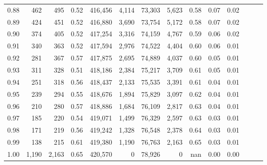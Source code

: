 \begin{tabular}{rrrrrrrrrrrrrr}
0.88 &     462 &    495 &  0.52 &  416,456 &    4,114 &  73,303 &   5,623 &  0.58 &  0.07 &      0.02 \\
0.89 &     424 &    451 &  0.52 &  416,880 &    3,690 &  73,754 &   5,172 &  0.58 &  0.07 &      0.02 \\
0.90 &     374 &    405 &  0.52 &  417,254 &    3,316 &  74,159 &   4,767 &  0.59 &  0.06 &      0.02 \\
0.91 &     340 &    363 &  0.52 &  417,594 &    2,976 &  74,522 &   4,404 &  0.60 &  0.06 &      0.01 \\
0.92 &     281 &    367 &  0.57 &  417,875 &    2,695 &  74,889 &   4,037 &  0.60 &  0.05 &      0.01 \\
0.93 &     311 &    328 &  0.51 &  418,186 &    2,384 &  75,217 &   3,709 &  0.61 &  0.05 &      0.01 \\
0.94 &     251 &    318 &  0.56 &  418,437 &    2,133 &  75,535 &   3,391 &  0.61 &  0.04 &      0.01 \\
0.95 &     239 &    294 &  0.55 &  418,676 &    1,894 &  75,829 &   3,097 &  0.62 &  0.04 &      0.01 \\
0.96 &     210 &    280 &  0.57 &  418,886 &    1,684 &  76,109 &   2,817 &  0.63 &  0.04 &      0.01 \\
0.97 &     185 &    220 &  0.54 &  419,071 &    1,499 &  76,329 &   2,597 &  0.63 &  0.03 &      0.01 \\
0.98 &     171 &    219 &  0.56 &  419,242 &    1,328 &  76,548 &   2,378 &  0.64 &  0.03 &      0.01 \\
0.99 &     138 &    215 &  0.61 &  419,380 &    1,190 &  76,763 &   2,163 &  0.65 &  0.03 &      0.01 \\
1.00 &   1,190 &  2,163 &  0.65 &  420,570 &        0 &  78,926 &       0 &   nan &  0.00 &      0.00 \\
\bottomrule
\end{tabular}
